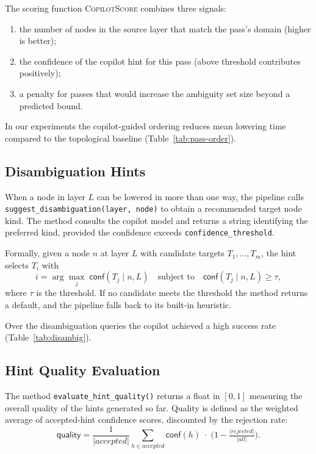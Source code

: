\documentclass[11pt]{article}
\newcommand{\conf}{\mathsf{conf}}
\newcommand{\quality}{\mathsf{quality}}
\begin{document}
The scoring function \textsc{CopilotScore} combines three signals:
\begin{enumerate}
\item the number of nodes in the source layer that match the pass's
  domain (higher is better);
\item the confidence of the copilot hint for this pass (above threshold
  contributes positively);
\item a penalty for passes that would increase the ambiguity set size
  beyond a predicted bound.
\end{enumerate}

In our experiments the copilot-guided ordering reduces mean lowering
time compared to the topological baseline
(Table~\ref{tab:pass-order}).

\subsection{Disambiguation Hints}\label{sec:disamb}

When a node in layer $L$ can be lowered in more than one way, the
pipeline calls
\texttt{suggest\_disambiguation(layer, node)} to obtain a recommended
target node kind.  The method consults the copilot model and returns a
string identifying the preferred kind, provided the confidence exceeds
\texttt{confidence\_threshold}.

Formally, given a node $n$ at layer $L$ with candidate targets
$T_1, \dots, T_m$, the hint selects $T_i$ with
\[
  i = \arg\max_j \; \conf(T_j \mid n, L)
  \quad\text{subject to}\quad \conf(T_j \mid n, L) \ge \tau,
\]
where $\tau$ is the threshold.  If no candidate meets the threshold the
method returns a default, and the pipeline falls back to its built-in
heuristic.

Over the disambiguation queries the copilot
achieved a high success rate (Table~\ref{tab:disambig}).

\subsection{Hint Quality Evaluation}\label{sec:quality}

The method \texttt{evaluate\_hint\_quality()} returns a float in
$[0, 1]$ measuring the overall quality of the hints generated so far.
Quality is defined as the weighted average of accepted-hint confidence
scores, discounted by the rejection rate:
\[
  \quality = \frac{1}{|\mathit{accepted}|}
    \sum_{h \in \mathit{accepted}} \conf(h)
    \;\cdot\; \bigl(1 - \tfrac{|\mathit{rejected}|}{|\mathit{all}|}\bigr).
\]
\end{document}
